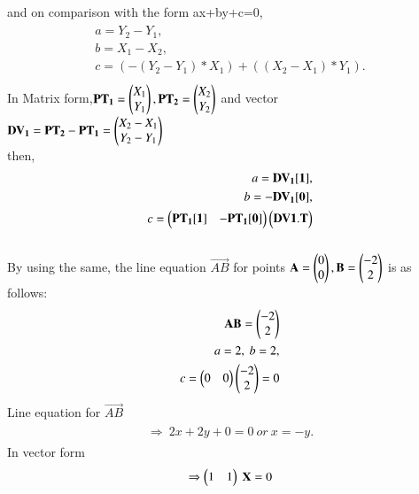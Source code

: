 \documentclass[journal,12pt,twocolumn]{IEEEtran}
\begin{document}
\\
and on comparison with the form ax+by+c=0,\\
\begin{align}
\begin{split}
a= Y_2-Y_1,\\ b=X_1-X_2, \\c=(-(Y_2-Y_1)*X_1)+((X_2-X_1)*Y_1).\\
\end{split}
\end{align}
In Matrix form,$
\mathbf{PT_1} = \begin{pmatrix}X_1\\Y_1\end{pmatrix}, \mathbf{PT_2} = \begin{pmatrix}X_2\\Y_2\end{pmatrix}$ and vector \\$\mathbf{DV_1} = \mathbf{PT_2 - PT_1} =\begin{pmatrix}X_2-X_1\\ Y_2-Y_1\end{pmatrix}$ \\then, 
\begin{align}
\begin{split}
a= \mathbf{DV_1[1]},\\ b=-\mathbf{DV_1[0]},\\ c = \begin{pmatrix}\mathbf{PT_1[1]}&\mathbf{-PT_1[0]}\end{pmatrix} \begin{pmatrix}\mathbf{DV1.T}\end{pmatrix}
\end{split}
\end{align}
\\
By using the same, the line equation $\vec{AB}$ for points $\mathbf{A} = \begin{pmatrix}0\\0\end{pmatrix},\mathbf{B}=\begin{pmatrix}-2\\2\end{pmatrix}$ is as follows:
\\
\begin{align}
\begin{split}
\mathbf{AB} = \begin{pmatrix}-2\\2\end{pmatrix}\\
a=2,\ b=2,\\
c=\begin{pmatrix}0 & 0\end{pmatrix} \begin{pmatrix}-2\\2\end{pmatrix}=0\\
\end{split}
\end{align}
Line equation for $\vec{AB}$
\begin{align}
\begin{split} \Rightarrow\ 2x+2y+0=0 \ or \ x=-y.
\end{split}
\end{align}
In vector form
\begin{align}
\begin{split}
\Rightarrow \begin{pmatrix}1&1\end{pmatrix}\ \mathbf{X}=0\\
\end{split}
\end{align}
\end{document}
